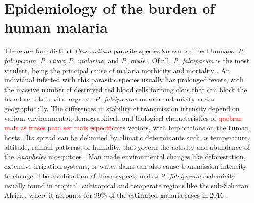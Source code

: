 
\section{Epidemiology of the burden of human malaria}
\label{seq:malaria.intro}
There are four distinct \textit{Plasmodium} parasite species known to infect humans: \textit{P. falciparum}, \textit{P. vivax}, \textit{P. malariae}, and \textit{P. ovale} \cite{who2017world}.
Of all, \textit{P. falciparum} is the most virulent, being the principal cause of malaria morbidity and mortality \cite{perlmann2002malaria}.
An individual infected with this parasitic species usually has prolonged fevers, with the massive number of destroyed red blood cells forming clots that can block the blood vessels in vital organs \cite{perlmann2002malaria,warrell2002essential}.
\textit{P. falciparum} malaria endemicity varies geographically.
The differences in stability of transmission intensity depend on various environmental, demographical, and biological characteristics of \textcolor{red}{quebrar mais as frases para ser mais específico}its vectors, with implications on the human hosts \cite{carter2002evolutionary, snow2002consequences}.
Its spread can be delimited by climatic determinants such as temperature, altitude, rainfall patterns, or humidity, that govern the activity and abundance of the \textit{Anopheles} mosquitoes \cite{warrell2002essential}.
Man made environmental changes like deforestation, extensive irrigation systems, or water dams can also cause transmission intensity to change.
The combination of these aspects makes \textit{P. falciparum} endemicity usually found in tropical, subtropical and temperate regions like the sub-Saharan Africa \cite{warrell2002essential}, where it accounts for 99\% of the estimated malaria cases in 2016 \cite{who2017world}.

